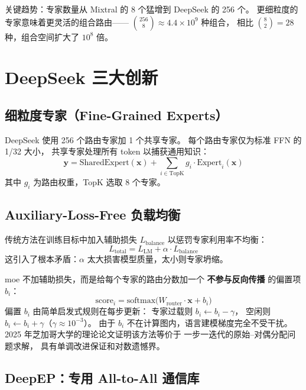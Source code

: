 \documentclass[
  customlatinfont = macos,
]{hkustthesis}
\begin{document}
关键趋势：专家数量从 Mixtral 的 8 个猛增到 DeepSeek 的 256 个。
更细粒度的专家意味着更灵活的组合路由——
$\binom{256}{8} \approx 4.4 \times 10^{9}$ 种组合，
相比 $\binom{8}{2} = 28$ 种，组合空间扩大了 $10^{8}$ 倍。

\section{DeepSeek 三大创新}

\subsection{细粒度专家（Fine-Grained Experts）}

DeepSeek 使用 256 个路由专家加 1 个共享专家。
每个路由专家仅为标准 FFN 的 1/32 大小，
共享专家处理所有 token 以捕获通用知识：
\begin{equation}
  \mathbf{y} = \mathrm{SharedExpert}(\mathbf{x})
  + \sum_{i \in \mathrm{TopK}} g_i \cdot \mathrm{Expert}_i(\mathbf{x})
  \label{eq:moe-output}
\end{equation}
其中 $g_i$ 为路由权重，TopK 选取 8 个专家。

\subsection{Auxiliary-Loss-Free 负载均衡}

传统方法在训练目标中加入辅助损失 $L_{\mathrm{balance}}$
以惩罚专家利用率不均衡：
\begin{equation}
  L_{\mathrm{total}} = L_{\mathrm{LM}} + \alpha \cdot L_{\mathrm{balance}}
\end{equation}
这引入了根本矛盾：$\alpha$ 太大损害模型质量，太小则专家坍缩。

\begin{insightbox}{moe}
不加辅助损失，而是给每个专家的路由分数加一个 \textbf{不参与反向传播} 的偏置项 $b_i$：
\[
  \mathrm{score}_i = \mathrm{softmax}\!\bigl(W_{\mathrm{router}} \cdot \mathbf{x} + b_i\bigr)
\]
偏置 $b_i$ 由简单启发式规则在每步更新：
专家过载则 $b_i \gets b_i - \gamma$，
空闲则 $b_i \gets b_i + \gamma$（$\gamma \approx 10^{-3}$）。
由于 $b_i$ 不在计算图内，语言建模梯度完全不受干扰。
2025 年芝加哥大学的理论论文证明该方法等价于
一步一迭代的原始--对偶分配问题求解，
具有单调改进保证和对数遗憾界。
\end{insightbox}

\subsection{DeepEP：专用 All-to-All 通信库}
\end{document}
